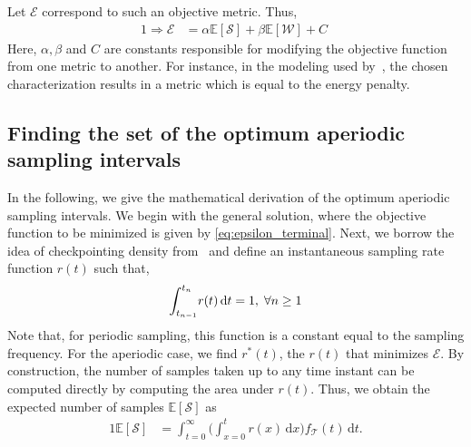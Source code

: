 Let $\mathcal{E}$ correspond to such an objective metric.
Thus, 
\begin{alignat}{1}
    \Rightarrow\mathcal{E}&=\alpha\mathbb{E}[\mathcal{S}]+\beta\mathbb{E}[\mathcal{W}]+C\;\label{eq:epsilon_terminal}
\end{alignat}
Here, $\alpha, \beta$ and $C$ are constants responsible for modifying the objective function from one metric to another.
For instance, in the modeling used by~\cite{moothedath2021energy,moothedath2022energy1,moothedath2022energy2}, the chosen characterization results in a metric which is equal to the energy penalty.

\subsection{Finding the set of the optimum aperiodic sampling intervals}

In the following, we give the mathematical derivation of the optimum aperiodic sampling intervals.
We begin with the general solution, where the objective function to be minimized is given by \cref{eq:epsilon_terminal}.
Next, we borrow the idea of checkpointing density from~\cite{satoshi1992optimal} and define an instantaneous sampling rate function $r(t)$ such that,
\begin{alignat}{1}
{\int_{t_{n-1}}^{t_n}}r(t)\,\mathrm{d} t=1,\;\forall n\geq1
\end{alignat}
Note that, for periodic sampling, this function is a constant equal to the sampling frequency.
For the aperiodic case, we find $r^*(t)$, the $r(t)$ that minimizes $\mathcal{E}$.
By construction, the number of samples taken up to any time instant can be computed directly by computing the area under $r(t)$.
Thus, we obtain the expected number of samples $\mathbb{E}[\mathcal{S}]$ as
\begin{alignat}{1}
\mathbb{E}[\mathcal{S}]&=\int_{t=0}^{\infty}\bigg(\!\int_{x=0}^{t}\!\!\!\!r(x)\,\mathrm{d}x\bigg)f_{\mathcal{T}}(t)\,\mathrm{d}t.\label{eq:Es}
\end{alignat}

